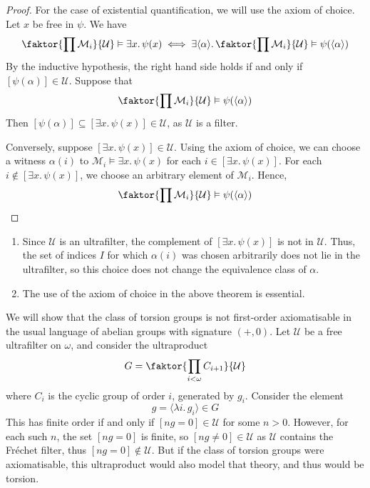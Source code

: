 \begin{proof}
    For the case of existential quantification, we will use the axiom of choice.
    Let \( x \) be free in \( \psi \).
    We have
    \[ \faktor{\prod \mathcal M_i}{\mathcal U} \vDash \exists x.\, \psi(x) \iff \exists \langle \alpha \rangle.\, \faktor{\prod \mathcal M_i}{\mathcal U} \vDash \psi(\langle \alpha \rangle) \]
    By the inductive hypothesis, the right hand side holds if and only if \( [\psi(\alpha)] \in \mathcal U \).
    Suppose that
    \[ \faktor{\prod \mathcal M_i}{\mathcal U} \vDash \psi(\langle \alpha \rangle) \]
    Then \( [\psi(\alpha)] \subseteq [\exists x.\, \psi(x)] \in \mathcal U \), as \( \mathcal U \) is a filter.

    Conversely, suppose \( [\exists x.\, \psi(x)] \in \mathcal U \).
    Using the axiom of choice, we can choose a witness \( \alpha(i) \) to \( \mathcal M_i \vDash \exists x.\, \psi(x) \) for each \( i \in [\exists x.\, \psi(x)] \).
    For each \( i \notin [\exists x.\, \psi(x)] \), we choose an arbitrary element of \( \mathcal M_i \).
    Hence,
    \[ \faktor{\prod \mathcal M_i}{\mathcal U} \vDash \psi(\langle \alpha \rangle) \]
\end{proof}
\begin{remark}
    \begin{enumerate}
        \item Since \( \mathcal U \) is an ultrafilter, the complement of \( [\exists x.\, \psi(x)] \) is not in \( \mathcal U \).
        Thus, the set of indices \( I \) for which \( \alpha(i) \) was chosen arbitrarily does not lie in the ultrafilter, so this choice does not change the equivalence class of \( \alpha \).
        \item The use of the axiom of choice in the above theorem is essential.
    \end{enumerate}
\end{remark}
\begin{example}
    We will show that the class of torsion groups is not first-order axiomatisable in the usual language of abelian groups with signature \( (+, 0) \).
    Let \( \mathcal U \) be a free ultrafilter on \( \omega \), and consider the ultraproduct
    \[ G = \faktor{\prod_{i < \omega} C_{i+1}}{\mathcal U} \]
    where \( C_i \) is the cyclic group of order \( i \), generated by \( g_i \).
    Consider the element
    \[ g = \langle \lambda i.\, g_i \rangle \in G \]
    This has finite order if and only if \( [ng = 0] \in \mathcal U \) for some \( n > 0 \).
    However, for each such \( n \), the set \( [ng = 0] \) is finite, so \( [ng \neq 0] \in \mathcal U \) as \( \mathcal U \) contains the Fr\'echet filter, thus \( [ng = 0] \notin \mathcal U \).
    But if the class of torsion groups were axiomatisable, this ultraproduct would also model that theory, and thus would be torsion.
\end{example}
